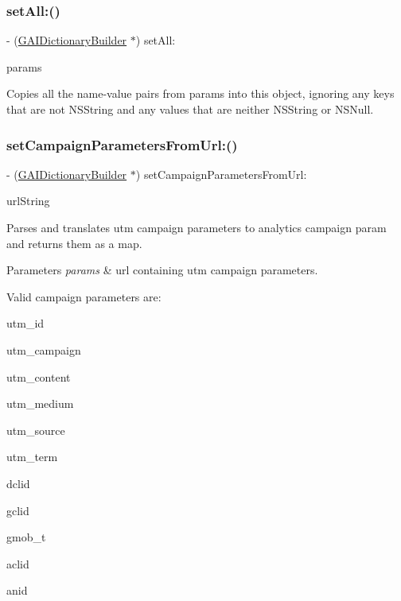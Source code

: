 \subsubsection{\texorpdfstring{set\+All\+:()}{setAll:()}}
{\footnotesize\ttfamily -\/ (\hyperlink{interface_g_a_i_dictionary_builder}{G\+A\+I\+Dictionary\+Builder} $\ast$) set\+All\+: \begin{DoxyParamCaption}\item[{(N\+S\+Dictionary $\ast$)}]{params }\end{DoxyParamCaption}}

Copies all the name-\/value pairs from params into this object, ignoring any keys that are not N\+S\+String and any values that are neither N\+S\+String or N\+S\+Null. \mbox{\label{interface_g_a_i_dictionary_builder_a58ad2b7a5a8279588214af3b94a2e60a}} 
\subsubsection{\texorpdfstring{set\+Campaign\+Parameters\+From\+Url\+:()}{setCampaignParametersFromUrl:()}}
{\footnotesize\ttfamily -\/ (\hyperlink{interface_g_a_i_dictionary_builder}{G\+A\+I\+Dictionary\+Builder} $\ast$) set\+Campaign\+Parameters\+From\+Url\+: \begin{DoxyParamCaption}\item[{(N\+S\+String $\ast$)}]{url\+String }\end{DoxyParamCaption}}

Parses and translates utm campaign parameters to analytics campaign param and returns them as a map.


\begin{DoxyParams}{Parameters}
{\em params} & url containing utm campaign parameters.\\
\hline
\end{DoxyParams}
Valid campaign parameters are\+: 
\begin{DoxyItemize}
\item utm\+\_\+id 
\item utm\+\_\+campaign 
\item utm\+\_\+content 
\item utm\+\_\+medium 
\item utm\+\_\+source 
\item utm\+\_\+term 
\item dclid 
\item gclid 
\item gmob\+\_\+t 
\item aclid 
\item anid 
\end{DoxyItemize}

